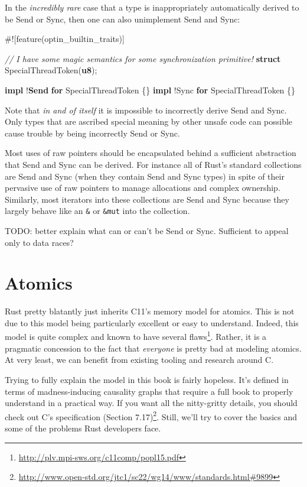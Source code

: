 \documentclass[a4paper,]{book}
\newenvironment{Shaded}{\begin{snugshade}}{\end{snugshade}}
\newcommand{\KeywordTok}[1]{\textcolor[rgb]{0.13,0.29,0.53}{\textbf{{#1}}}}
\newcommand{\CommentTok}[1]{\textcolor[rgb]{0.56,0.35,0.01}{\textit{{#1}}}}
\newcommand{\NormalTok}[1]{{#1}}
\renewcommand{\href}[2]{#2\footnote{\url{#1}}}
\begin{document}
In the \emph{incredibly rare} case that a type is inappropriately
automatically derived to be Send or Sync, then one can also unimplement
Send and Sync:

\begin{Shaded}
\begin{Highlighting}[]
\NormalTok{#![feature(optin_builtin_traits)]}

\CommentTok{// I have some magic semantics for some synchronization primitive!}
\KeywordTok{struct} \NormalTok{SpecialThreadToken(}\KeywordTok{u8}\NormalTok{);}

\KeywordTok{impl} \NormalTok{!}\KeywordTok{Send} \KeywordTok{for} \NormalTok{SpecialThreadToken \{\}}
\KeywordTok{impl} \NormalTok{!Sync }\KeywordTok{for} \NormalTok{SpecialThreadToken \{\}}
\end{Highlighting}
\end{Shaded}

Note that \emph{in and of itself} it is impossible to incorrectly derive
Send and Sync. Only types that are ascribed special meaning by other
unsafe code can possible cause trouble by being incorrectly Send or
Sync.

Most uses of raw pointers should be encapsulated behind a sufficient
abstraction that Send and Sync can be derived. For instance all of
Rust's standard collections are Send and Sync (when they contain Send
and Sync types) in spite of their pervasive use of raw pointers to
manage allocations and complex ownership. Similarly, most iterators into
these collections are Send and Sync because they largely behave like an
\texttt{\&} or \texttt{\&mut} into the collection.

TODO: better explain what can or can't be Send or Sync. Sufficient to
appeal only to data races?

\section{Atomics}\label{sec--atomics}

Rust pretty blatantly just inherits C11's memory model for atomics. This
is not due to this model being particularly excellent or easy to
understand. Indeed, this model is quite complex and known to have
\href{http://plv.mpi-sws.org/c11comp/popl15.pdf}{several flaws}. Rather,
it is a pragmatic concession to the fact that \emph{everyone} is pretty
bad at modeling atomics. At very least, we can benefit from existing
tooling and research around C.

Trying to fully explain the model in this book is fairly hopeless. It's
defined in terms of madness-inducing causality graphs that require a
full book to properly understand in a practical way. If you want all the
nitty-gritty details, you should check out
\href{http://www.open-std.org/jtc1/sc22/wg14/www/standards.html\#9899}{C's
specification (Section 7.17)}. Still, we'll try to cover the basics and
some of the problems Rust developers face.
\end{document}

